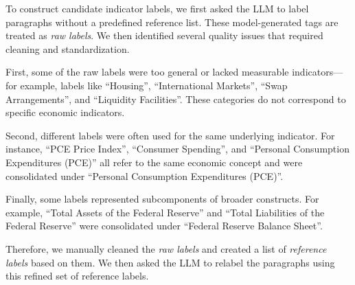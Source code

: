 To construct candidate indicator labels, we first asked the LLM to label paragraphs without a predefined reference list. These model-generated tags are treated as \textit{raw labels}. We then identified several quality issues that required cleaning and standardization.


First, some of the raw labels were too general or lacked measurable indicators—for example, labels like ``Housing'', ``International Markets'', ``Swap Arrangements'', and ``Liquidity Facilities''. These categories do not correspond to specific economic indicators.


Second, different labels were often used for the same underlying indicator. For instance, ``PCE Price Index'', ``Consumer Spending'', and ``Personal Consumption Expenditures (PCE)'' all refer to the same economic concept and were consolidated under ``Personal Consumption Expenditures (PCE)''.


Finally, some labels represented subcomponents of broader constructs. For example, ``Total Assets of the Federal Reserve'' and ``Total Liabilities of the Federal Reserve'' were consolidated under ``Federal Reserve Balance Sheet''.



Therefore, we manually cleaned the \textit{raw labels} and created a list of \textit{reference labels} based on them. We then asked the LLM to relabel the paragraphs using this refined set of reference labels.



